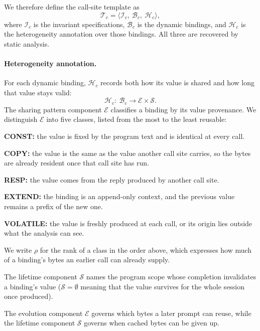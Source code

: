 We therefore define the call-site template as
\[
\mathcal{T}_c=\langle \mathcal{I}_c,\ \mathcal{B}_c,\ \mathcal{H}_c \rangle ,
\]
where $\mathcal{I}_c$ is the invariant specifications, $\mathcal{B}_c$ is the dynamic bindings, and $\mathcal{H}_c$ is the heterogeneity annotation over those bindings. All three are recovered by static analysis. 

\paragraph{Heterogeneity annotation.}
For each dynamic binding, $\mathcal{H}_c$ records both how its value is shared and how long that value stays valid:
\[
\mathcal{H}_c:\ \mathcal{B}_c \longrightarrow \mathcal{E} \times \mathcal{S} .
\]
The sharing pattern component $\mathcal{E}$ classifies a binding by its value provenance. We distinguish $\mathcal{E}$ into five classes, listed from the most to the least reusable:
\begin{enumerate*}[label=\textbf{(\roman*)}]
    \item \textbf{CONST:} the value is fixed by the program text and is identical at every call.
    \item \textbf{COPY:} the value is the same as the value another call site carries, so the bytes are already resident once that call site has run.
    \item \textbf{RESP:} the value comes from the reply produced by another call site.
    \item \textbf{EXTEND:} the binding is an append-only context, and the previous value remains a prefix of the new one.
    \item \textbf{VOLATILE:} the value is freshly produced at each call, or its origin lies outside what the analysis can see.
\end{enumerate*}
We write $\rho$ for the rank of a class in the order above, which expresses how much of a binding's bytes an earlier call can already supply. 

The lifetime component $\mathcal{S}$ names the program scope whose completion invalidates a binding's value ($\mathcal{S}=\emptyset$ meaning that the value survives for the whole session once produced). 

The evolution component $\mathcal{E}$ governs which bytes a later prompt can reuse, while the lifetime component $\mathcal{S}$ governs when cached bytes can be given up.

